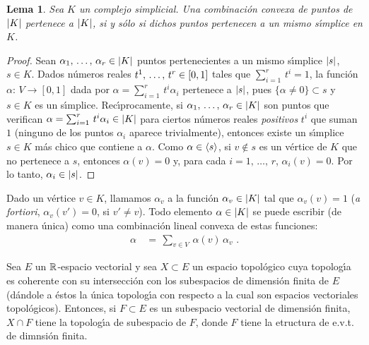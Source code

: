 \theoremstyle{plain}
\newtheorem{lemaCombinacionConvexaEnComplejos}{Lema}[section]

\theoremstyle{remark}
\newtheorem{obsSimplicialEsLineal}[lemaCombinacionConvexaEnComplejos]%
	{Observaci\'{o}n}


\begin{lemaCombinacionConvexaEnComplejos}%
	\label{thm:combinacionconvexaencomplejos}
	Sea $K$ un complejo simplicial. Una combinaci\'{o}n convexa
	de puntos de $\left|K\right|$ pertenece a $\left|K\right|$, si y s\'{o}lo si
	dichos puntos pertenecen a un mismo s\'{\i}mplice en $K$.
\end{lemaCombinacionConvexaEnComplejos}

\begin{proof}
	Sean $\lista{\alpha}{r}\in\geom{K}$ puntos pertenecientes a un
	mismo s\'{\i}mplice $\left|s\right|$, $s\in K$. Dados n\'{u}meros reales
	$\lista*{t}{r}\in [0,1]$ tales que $\sum_{i=1}^{r}\,t^{i}=1$,
	la funci\'{o}n $\alpha:\,V\rightarrow [0,1]$ dada por
	$\alpha=\sum_{i=1}^{r}\,t^{i}\alpha_{i}$ pertenece a $\left|s\right|$,
	pues $\{\alpha\not=0\}\subset s$ y $s\in K$ es un s\'{\i}mplice.
	Rec\'{\i}procamente, si $\lista{\alpha}{r}\in\geom{K}$ son puntos que
	verifican $\alpha=\sum_{i=1}^{r}\,t^{i}\alpha_{i}\in\left|K\right|$ para
	ciertos n\'{u}meros reales \emph{positivos} $t^{i}$ que suman $1$
	(ninguno de los puntos $\alpha_{i}$ aparece trivialmente), entonces
	existe un s\'{\i}mplice $s\in K$ m\'{a}s chico que contiene a
	$\alpha$. Como $\alpha\in\langle s\rangle$, si $v\not\in s$ es un
	v\'{e}rtice de $K$ que no pertenece a $s$, entonces
	$\alpha(v)=0$ y, para cada $i=1,\,\dots,\,r$, $\alpha_{i}(v)=0$.
	Por lo tanto, $\alpha_{i}\in\left|s\right|$.
\end{proof}

Dado un v\'{e}rtice $v\in K$, llamamos $\alpha_{v}$ a la funci\'{o}n
$\alpha_{v}\in\left|K\right|$ tal que $\alpha_{v}(v)=1$ (\textit{a fortiori},
$\alpha_{v}(v')=0$, si $v'\not = v$). Todo elemento $\alpha\in\left|K\right|$
se puede escribir (de manera \'{u}nica) como una combinaci\'{o}n lineal
convexa de estas funciones:
\begin{align*}
	\alpha & \,=\,\sum_{v\in V}\,\alpha(v)\,\alpha_{v}
	\text{ .}
\end{align*}
%

Sea $E$ un $\mathbb{R}$-espacio vectorial y sea $X\subset E$ un espacio
topol\'{o}gico cuya topolog\'{\i}a es coherente con su intersecci\'{o}n
con los subespacios de dimensi\'{o}n finita de $E$ (d\'{a}ndole a \'{e}stos
la \'{u}nica topolog\'{\i}a con respecto a la cual son espacios vectoriales
topol\'{o}gicos).
Entonces, si $F\subset E$ es un subespacio vectorial de dimensi\'{o}n finita,
$X\cap F$ tiene la topolog\'{\i}a de subespacio de $F$, donde $F$ tiene
la etructura de e.v.t. de dimnsi\'{o}n finita.

